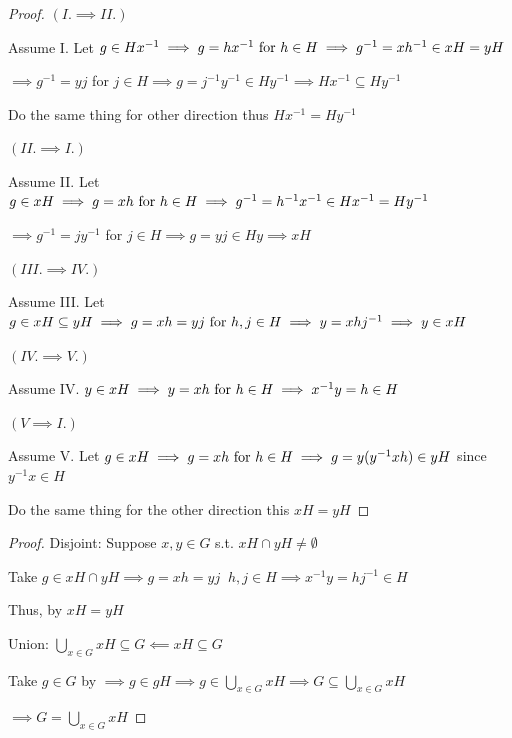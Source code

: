 \begin{proof}
    $(I.\implies II.)$

    Assume I. Let $g\in Hx^{-1} \implies g=hx^{-1} \text{ for } h\in H\implies g^{-1}=xh^{-1} \in xH=yH$

    $\implies g^{-1}=yj$ for $j \in H \implies g=j^{-1}y^{-1}\in Hy^{-1} \implies Hx^{-1}\subseteq Hy^{-1}$

    Do the same thing for other direction thus $Hx^{-1}=Hy^{-1}$

    $(II. \implies I.)$

    Assume II. Let $g \in xH \implies g=xh \text{ for } h\in H \implies g^{-1}=h^{-1}x^{-1}\in Hx^{-1}=Hy^{-1}$

    $\implies g^{-1}=jy^{-1}$ for $j \in H \implies g=yj\in Hy \implies xH$

    $(III. \implies IV.)$
    
    Assume III. Let $g \in xH \subseteq yH \implies g=xh=yj \text{ for } h,j \in H \implies y=xhj^{-1} \implies y\in xH$

    $(IV. \implies V.)$

    Assume IV. $y \in xH \implies y=xh \text{ for } h \in H \implies x^{-1}y=h \in H$

    $(V \implies I.)$

    Assume V. Let $g \in xH \implies g=xh \text{ for } h \in H \implies g=y(y^{-1}xh) \in yH$ since $y^{-1}x \in H$
    
    Do the same thing for the other direction this $xH=yH$
\end{proof}


\begin{proof}
    \phantom{text}

    Disjoint: Suppose $x,y \in G$ s.t. $xH \cap yH \neq \emptyset$

    Take $g \in xH \cap yH \implies g=xh=yj\;\; h,j \in H \implies x^{-1}y=hj^{-1}\in H$

    Thus, by  $xH=yH$

    Union: $\underset{x \in G}{\bigcup}xH \subseteq G \impliedby xH \subseteq G$

    Take $g \in G$ by  $\implies g\in gH \implies g \in \underset{x \in G}{\bigcup}xH \implies G \subseteq \underset{x \in G}{\bigcup}xH$

    $\implies G = \underset{x \in G}{\bigcup}xH$
\end{proof}

